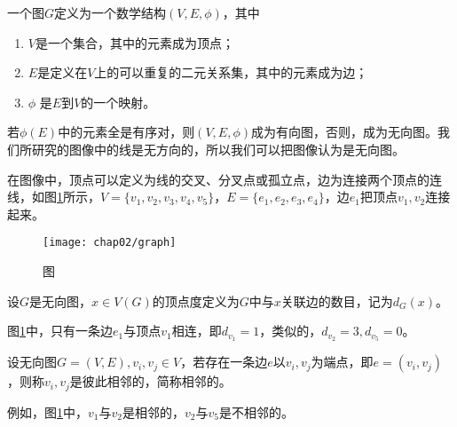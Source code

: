 \begin{definition}
一个图$G$定义为一个数学结构$(V, E, \phi)$\cite{xujunming}，其中
\begin{enumerate}
\item $V$是一个集合，其中的元素成为顶点；
\item $E$是定义在$V$上的可以重复的二元关系集，其中的元素成为边；
\item $\phi$ 是$E$到$V$的一个映射。 
\end{enumerate}
若$\phi(E)$中的元素全是有序对，则$(V, E, \phi)$成为有向图，否则，成为无向图。我们所研究的图像中的线是无方向的，所以我们可以把图像认为是无向图。
\end{definition}

在图像中，顶点可以定义为线的交叉、分叉点或孤立点，边为连接两个顶点的连线，如图\ref{fig:graph}所示，$V = \{v_1, v_2, v_3, v_4, v_5\}$，$E = \{e_1, e_2, e_3, e_4\}$，边$e_1$把顶点$v_1, v_2$连接起来。

\begin{figure}[H] %
  \centering
  \texttt{[image: chap02/graph]}
  \caption{图}
  \label{fig:graph}
\end{figure}

\begin{definition}
设$G$是无向图，$x\in V(G)$的顶点度定义为$G$中与$x$关联边的数目，记为$d_{G}(x)$\cite{wangshuhe}。
\end{definition}

图\ref{fig:graph}中，只有一条边$e_1$与顶点$v_1$相连，即$d_{v_1}=1$，类似的，$d_{v_2}=3, d_{v_5}=0$。


\begin{definition}
设无向图$G = (V, E), v_i, v_j \in V$，若存在一条边$e$以$v_i, v_j$为端点，即$e = (v_i, v_j)$，则称$v_i, v_j$是彼此相邻的，简称相邻的。 
\end{definition}
例如，图\ref{fig:graph}中，$v_1$与$v_2$是相邻的，$v_2$与$v_5$是不相邻的。

